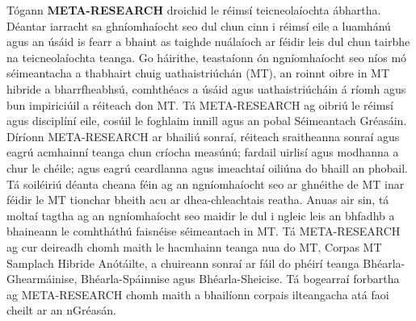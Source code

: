 \documentclass[]{../../metanetpaper}
\begin{document}
\begin{multicols}{2}
Tógann \textbf{META-RESEARCH} droichid le réimsí teicneolaíochta ábhartha. Déantar iarracht sa ghníomhaíocht seo dul chun cinn i réimsí eile a luamhánú agus an úsáid is fearr a bhaint as taighde nuálaíoch ar féidir leis dul chun tairbhe na teicneolaíochta teanga. Go háirithe, teastaíonn ón ngníomhaíocht seo níos mó séimeantacha a thabhairt chuig uathaistriúchán (MT), an roinnt oibre in MT hibride a bharrfheabhsú, comhthéacs a úsáid agus uathaistriúcháin á ríomh agus bun impiriciúil a réiteach don MT. Tá META-RESEARCH ag oibriú le réimsí agus disciplíní eile, cosúil le foghlaim innill agus an pobal Séimeantach Gréasáin. Díríonn META-RESEARCH ar bhailiú sonraí, réiteach sraitheanna sonraí agus eagrú acmhainní teanga chun críocha measúnú; fardail uirlisí agus modhanna a chur le chéile; agus eagrú ceardlanna agus imeachtaí oiliúna do bhaill an phobail. Tá soiléiriú déanta cheana féin ag an ngníomhaíocht seo ar ghnéithe de MT inar féidir le MT tionchar bheith acu ar dhea-chleachtais reatha. Anuas air sin, tá moltaí tagtha ag an ngníomhaíocht seo maidir le dul i ngleic leis an bhfadhb a bhaineann le comhtháthú faisnéise séimeantach in MT. Tá META-RESEARCH ag cur deireadh chomh maith le hacmhainn teanga nua do MT, Corpas MT Samplach Hibride Anótáilte, a chuireann sonraí ar fáil do phéirí teanga Bhéarla-Ghearmáinise, Bhéarla-Spáinnise agus Bhéarla-Sheicise. Tá bogearraí forbartha ag META-RESEARCH chomh maith a bhailíonn corpais ilteangacha atá faoi cheilt ar an nGréasán.
\end{multicols}


\setcounter{section}{0}
\setcounter{figure}{0}

\cleardoublepage


\end{document}
